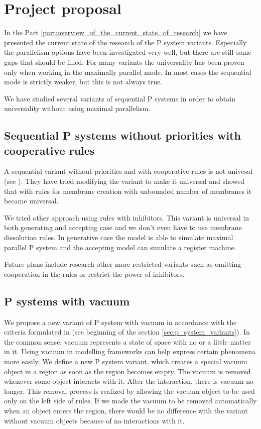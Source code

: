 \chapter{Project proposal} %
\label{cha:project_proposal}

In the Part \ref{part:overview_of_the_current_state_of_research} we have presented the current state of the research of the P system variants. Especially the parallelism options have been investigated very well, but there are still some gaps that should be filled. For many variants the universality has been proven only when working in the maximally parallel mode. In most cases the sequential mode is strictly weaker, but this is not always true.

We have studied several variants of sequential P systems in order to obtain universality without using maximal parallelism.

\section{Sequential P systems without priorities with cooperative rules} %
\label{sec:sequential_p_systems_without_priorities_with_cooperative_rules}

A sequential variant without priorities and with cooperative rules is not univesal (see \cite{Ibarra04dang}). They have tried modifying the variant to make it universal and showed that with rules for membrane creation with unbounded number of membranes it became universal.

We tried other approach using rules with inhibitors. This variant is universal in both generating and accepting case and we don't even have to use membrane dissolution rules. In generative case the model is able to simulate maximal parallel P system and the accepting model can simulate a register machine.

Future plans include research other more restricted variants such as omitting cooperation in the rules or restrict the power of inhibitors.

\section{P systems with vacuum} %
\label{sec:p_systems_with_vacuum}

We propose a new variant of P system with vacuum in accordance with the criteria formulated in \cite{Besozzi:PhD:2004} (see beginning of the section \ref{sec:p_system_variants}). In the common sense, vacuum represents a state of space with no or a little matter in it. Using vacuum in modelling frameworks can help express certain phenomena more easily. We define a new P system variant, which creates a special vacuum object in a region as soon as the region becomes empty. The vacuum is removed whenever some object interacts with it. After the interaction, there is vacuum no longer. This removal process is realized by allowing the vacuum object to be used only on the left side of rules. If we made the vacuum to be removed automatically when an object enters the region, there would be no difference with the variant without vacuum objects because of no interactions with it.

